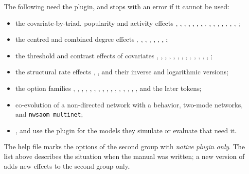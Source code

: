 The following need the plugin, and \nwsaom{} stops with an error if it cannot be used:
\begin{itemize}
\item the covariate-by-triad, popularity and activity effects , , , , , , , , , , , , , , , ;
\item the centred and combined degree effects , , , , , , , ;
\item the threshold and contrast effects of covariates , , , , , , , , , , , , , ;
\item the structural rate effects , ,  and their inverse and logarithmic versions;
\item the option families , , , , , , , , , , , , , , , ,  and the later  tokens;
\item co-evolution of a non-directed network with a behavior, two-mode networks, and \texttt{nwsaom multinet};
\item {},  and  use the plugin for the models they simulate or evaluate that need it.
\end{itemize}
The help file marks the options of the second group with \emph{native plugin only}. The list above describes the situation when the manual was written; a new version of \nwsaom{} adds new effects to the second group only.
